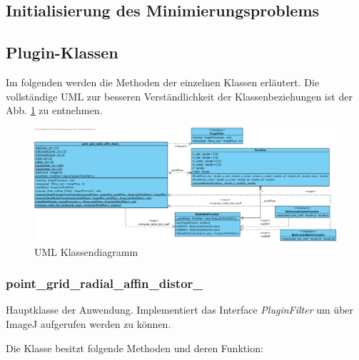\subsection{Initialisierung des Minimierungsproblems}

\subsection{Plugin-Klassen}

Im folgenden werden die Methoden der einzelnen Klassen erläutert. Die vollständige UML zur besseren Verständlichkeit der Klassenbeziehungen ist der Abb. \ref{img:UML} zu entnehmen.

\begin{figure}[H]
	\center
	\includegraphics[width=\textheight, angle =90]{Images/Class Diagram1.png}
	\caption{UML Klassendiagramm}
	\label{img:UML}
\end{figure}

\subsubsection{point\_grid\_radial\_affin\_distor\_}
Hauptklasse der Anwendung. Implementiert das Interface \emph{PluginFilter} um über ImageJ aufgerufen werden zu können.

Die Klasse besitzt folgende Methoden und deren Funktion:

